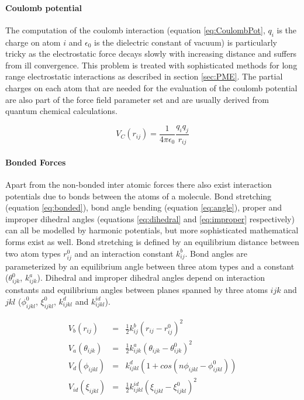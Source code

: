 \documentclass[english, a4paper, 12pt, titlepage, draft]{article}
\begin{document}
\paragraph{Coulomb potential}
The computation of the coulomb interaction (equation \ref{eq:CoulombPot}, $q_i$ is the charge on atom $i$ and $\epsilon_0$ is the dielectric constant of vacuum) is particularly tricky as the electrostatic force decays slowly with increasing distance and suffers from ill convergence.
This problem is treated with sophisticated methods for long range electrostatic interactions as described in section \ref{sec:PME}.
The partial charges on each atom that are needed for the evaluation of the coulomb potential are also part of the force field parameter set and are usually derived from quantum chemical calculations.

\begin{equation}
    V_C(r_{ij}) = \frac{1}{4\pi \epsilon_0} \frac{q_i q_j}{r_{ij}}
    \label{eq:CoulombPot}
\end{equation}

\paragraph{Bonded Forces}
Apart from the non-bonded inter atomic forces there also exist interaction potentials due to bonds between the atoms of a molecule.
Bond stretching (equation \ref{eq:bonded}), bond angle bending (equation \ref{eq:angle}), proper and improper dihedral angles (equations \ref{eq:dihedral} and \ref{eq:improper} respectively) can all be modelled by harmonic potentials, but more sophisticated mathematical forms exist as well.
Bond stretching is defined by an equilibrium distance between two atom types $r^0_{ij}$ and an interaction constant $k^b_{ij}$.
Bond angles are parameterized by an equilibrium angle between three atom types and a constant ($\theta^0_{ijk}$, $k^a_{ijk}$).
Dihedral and improper dihedral angles depend on interaction constants and equilibrium angles between planes spanned by three atoms $ijk$ and $jkl$ ($\phi^0_{ijkl}$, $\xi^0_{ijkl}$, $k^d_{ijkl}$ and $k^{id}_{ijkl}$).


\begin{eqnarray}
    V_b(r_{ij})        & = & \frac{1}{2} k^b_{ij}(r_{ij}-r^0_{ij})^2 \label{eq:bonded} \\
    V_a(\theta_{ijk})  & = & \frac{1}{2} k^a_{ijk}(\theta_{ijk}-\theta^0_{ijk})^2 \label{eq:angle} \\
    V_d(\phi_{ijkl})   & = & k^d_{ijkl}(1+cos(n\phi_{ijkl}-\phi^0_{ijkl})) \label{eq:dihedral}\\
    V_{id}(\xi_{ijkl}) & = & \frac{1}{2} k^{id}_{ijkl}(\xi_{ijkl}-\xi^0_{ijkl})^2 \label{eq:improper}
\end{eqnarray}
\end{document}
